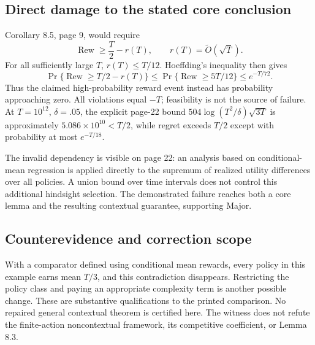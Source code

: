 \documentclass[10pt]{article}
\begin{document}
\subsection*{Direct damage to the stated core conclusion}
Corollary 8.5, page 9, would require \[\operatorname{Rew}\ge \frac{T}{2}-r(T),
 \qquad r(T)=\widetilde O(\sqrt T).\] For all sufficiently large \(T\), \(r(T)\le T/12\). Hoeffding’s inequality then gives \[\Pr\{\operatorname{Rew}\ge T/2-r(T)\}
 \le \Pr\{\operatorname{Rew}\ge5T/12\}
 \le e^{-T/72}.\] Thus the claimed high-probability reward event instead has probability approaching zero. All violations equal \(-T\); feasibility is not the source of failure. At \(T=10^{12}\), \(\delta=.05\), the explicit page-22 bound \(504\log(T^2/\delta)\sqrt{3T}\) is approximately \(5.086\times10^{10}<T/2\), while regret exceeds \(T/2\) except with probability at most \(e^{-T/18}\).\par
The invalid dependency is visible on page 22: an analysis based on conditional-mean regression is applied directly to the supremum of realized utility differences over all policies. A union bound over time intervals does not control this additional hindsight selection. The demonstrated failure reaches both a core lemma and the resulting contextual guarantee, supporting Major.\par
\subsection*{Counterevidence and correction scope}
With a comparator defined using conditional mean rewards, every policy in this example earns mean \(T/3\), and this contradiction disappears. Restricting the policy class and paying an appropriate complexity term is another possible change. These are substantive qualifications to the printed comparison. No repaired general contextual theorem is certified here. The witness does not refute the finite-action noncontextual framework, its competitive coefficient, or Lemma 8.3.\par
\end{document}
